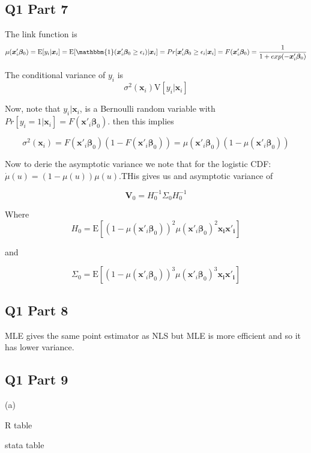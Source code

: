 \documentclass[11pt]{article}
\newcommand{\E}{\mathrm{E}}
\newcommand{\V}{\mathrm{V}}
\begin{document}
\subsection{Q1 Part 7}
The link function is 
$$\mu(\bm{x}'_i \bm{\beta}_0) = \E[y_i|\bm{x}_i] = \E[\mathbbm{1}(\bm{x}'_i \bm{\beta}_0 \geq \epsilon_i)|\bm{x}_i] =Pr[\bm{x}'_i \bm{\beta}_0 \geq \epsilon_i|\bm{x}_i] = F(\bm{x}'_i \bm{\beta}_0) = \frac{1}{1+exp(-\bm{x}'_i \bm{\beta}_0)}
$$

The conditional variance of $y_i$ is 
$$\sigma^2(\bm{x}_i) \V[y_i|\bm{x}_i]$$

Now, note that $y_i|\bm{x}_i$, is a Bernoulli random variable with $Pr[y_i = 1|\bm{x}_i] = F(\bm{x}'_i \bm{\beta}_0). $ then this implies 

$$ \sigma^2(\bm{x}_i) = F(\bm{x}'_i\bm{\beta}_0)(1-F(\bm{x}'_i\bm{\beta}_0))= \mu(\bm{x}'_i\bm{\beta}_0)(1-\mu(\bm{x}'_i\bm{\beta}_0))
$$

Now to derie the asymptotic variance we note that for the logistic CDF: $\dot{\mu}(u)=(1-\mu(u))\mu(u)$.THis gives us and asymptotic variance of 

$$\bm{V}_0 = H_0^{-1} \Sigma_0 H_0^{-1} $$

Where 
$$H_0 =\E[(1-\mu(\bm{x}'_i \bm{\beta}_0))^2\mu(\bm{x}'_i\bm{\beta}_0)^2 \bm{x_ix'_i}] $$

and 

$$ 
\Sigma_0 = \E[(1-\mu(\bm{x}'_i \bm{\beta}_0))^3\mu(\bm{x}'_i\bm{\beta}_0)^3 \bm{x_ix'_i}] $$


\subsection{Q1 Part 8}
MLE gives the same point estimator as NLS but MLE is more efficient and so it has lower variance. 


\subsection{Q1 Part 9 }
(a)\\

\centerline{R table }

\begin{center}
	
\end{center}

\centerline{stata table }

\begin{center}
	
\end{center}
\end{document}
